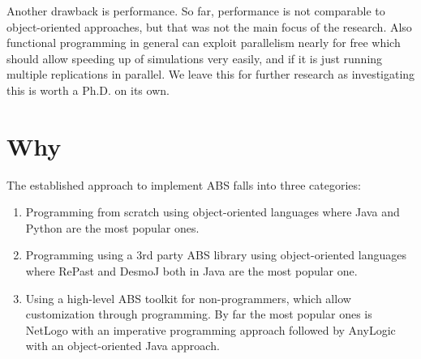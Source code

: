 Another drawback is performance. So far, performance is not comparable to object-oriented approaches, but that was not the main focus of the research. Also functional programming in general can exploit parallelism nearly for free which should allow speeding up of simulations very easily, and if it is just running multiple replications in parallel. We leave this for further research as investigating this is worth a Ph.D. on its own.

\section{Why}

The established approach to implement ABS falls into three categories:
\begin{enumerate}
	\item Programming from scratch using object-oriented languages where Java and Python are the most popular ones.
	\item Programming using a 3rd party ABS library using object-oriented languages where RePast and DesmoJ both in Java are the most popular one.
	\item Using a high-level ABS toolkit for non-programmers, which allow customization through programming. By far the most popular ones is NetLogo with an imperative programming approach followed by AnyLogic with an object-oriented Java approach.
\end{enumerate}

